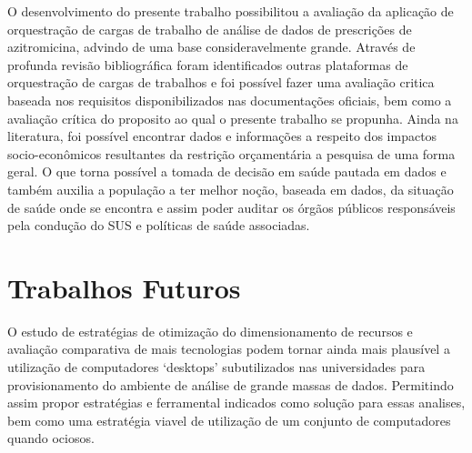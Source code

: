 O desenvolvimento do presente trabalho possibilitou a avaliação da aplicação de orquestração de cargas de trabalho de análise de dados de prescrições de azitromicina, advindo de uma base consideravelmente grande. Através de profunda revisão bibliográfica foram identificados outras plataformas de orquestração de cargas de trabalhos e foi possível fazer uma avaliação critica baseada nos requisitos disponibilizados nas documentações oficiais, bem como a avaliação crítica do proposito ao qual o presente trabalho se propunha. Ainda na literatura, foi possível encontrar dados e informações a respeito dos impactos socio-econômicos resultantes da restrição orçamentária a pesquisa de uma forma geral.  O que torna possível a tomada de decisão em saúde pautada em dados e também auxilia a população a ter melhor noção, baseada em dados, da situação de saúde onde se encontra e assim poder auditar os órgãos públicos responsáveis pela condução do SUS e políticas de saúde associadas.

\section{Trabalhos Futuros}
\label{sec:trabalhosFuturos}

O estudo de estratégias de otimização do dimensionamento de recursos e avaliação comparativa de mais tecnologias podem tornar ainda mais plausível a utilização de computadores ‘desktops’ subutilizados nas universidades para provisionamento do ambiente de análise de grande massas de dados. Permitindo assim propor estratégias e ferramental indicados como solução para essas analises, bem como uma estratégia viavel de utilização de um conjunto de computadores quando ociosos.



